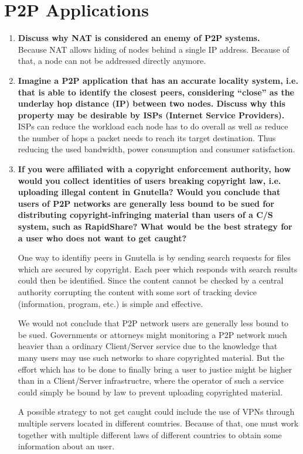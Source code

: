 \documentclass{article}
\begin{document}
\section{P2P Applications}
  \begin{enumerate}[1]
    \item \textbf{Discuss why NAT is considered an enemy of P2P systems.} \\
          Because NAT allows hiding of nodes behind a single IP address. Because of that, a node can not be addressed directly anymore.
    \item \textbf{Imagine a P2P application that has an accurate locality system, i.e. that is able to identify the closest peers, considering “close” as the underlay hop distance (IP) between two nodes. Discuss why this property may be desirable by ISPs (Internet Service Providers).} \\
          ISPs can reduce the workload each node has to do overall as well as reduce the number of hops a packet needs to reach its target destination.
          Thus reducing the used bandwidth, power consumption and consumer satisfaction.

    \item \textbf{If you were affiliated with a copyright enforcement authority, how would you collect identities of users breaking copyright law, i.e. uploading illegal content in Gnutella? Would you conclude that users of P2P networks are generally less bound to be sued for distributing copyright-infringing material than users of a C/S system, such as RapidShare? What would be the best strategy for a user who does not want to get caught?}

          One way to identifiy peers in Gnutella is by sending search requests
          for files which are secured by copyright. Each peer which responds
          with search  results could then be identified. Since the content
          cannot be checked by a central authority corrupting the content with
          some sort of tracking device (information, program, etc.) is simple
          and effective.

          We would not conclude that P2P network users are generally less
          bound to be sued. Governments or attorneys might monitoring a P2P
          network  much heavier than a ordinary Client/Server service due to
          the knowledge that many users may use such networks to share
          copyrighted material. But the effort which has to be done to finally
          bring a user to justice might be higher than in a Client/Server
          infrastructre,  where the operator of such a service could simply be
          bound by law to prevent uploading copyrighted material.
          
          A possible strategy to not get caught could include the use of VPNs
          through multiple servers located in different countries. Because of
          that, one must work together with multiple different laws of
          different countries to obtain some information about an user.


  \end{enumerate}
\end{document}

